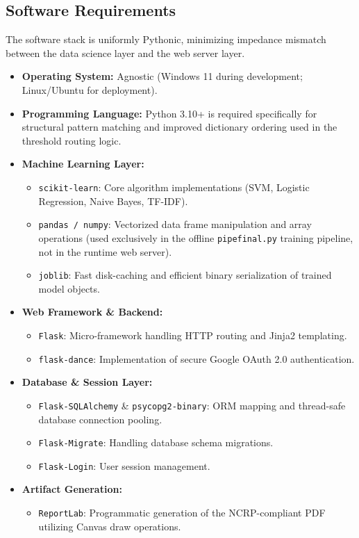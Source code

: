 \subsection{Software Requirements}
The software stack is uniformly Pythonic, minimizing impedance mismatch between the data science layer and the web server layer.
\begin{itemize}
    \item \textbf{Operating System:} Agnostic (Windows 11 during development; Linux/Ubuntu for deployment).
    \item \textbf{Programming Language:} Python 3.10+ is required specifically for structural pattern matching and improved dictionary ordering used in the threshold routing logic.
    \item \textbf{Machine Learning Layer:}
    \begin{itemize}
        \item \texttt{scikit-learn}: Core algorithm implementations (SVM, Logistic Regression, Naive Bayes, TF-IDF).
        \item \texttt{pandas / numpy}: Vectorized data frame manipulation and array operations (used exclusively in the offline \texttt{pipefinal.py} training pipeline, not in the runtime web server).
        \item \texttt{joblib}: Fast disk-caching and efficient binary serialization of trained model objects.
    \end{itemize}
    \item \textbf{Web Framework \& Backend:}
    \begin{itemize}
        \item \texttt{Flask}: Micro-framework handling HTTP routing and Jinja2 templating.
        \item \texttt{flask-dance}: Implementation of secure Google OAuth 2.0 authentication.
    \end{itemize}
    \item \textbf{Database \& Session Layer:}
    \begin{itemize}
        \item \texttt{Flask-SQLAlchemy} \& \texttt{psycopg2-binary}: ORM mapping and thread-safe database connection pooling.
        \item \texttt{Flask-Migrate}: Handling database schema migrations.
        \item \texttt{Flask-Login}: User session management.
    \end{itemize}
    \item \textbf{Artifact Generation:}
    \begin{itemize}
        \item \texttt{ReportLab}: Programmatic generation of the NCRP-compliant PDF utilizing Canvas draw operations.
    \end{itemize}
\end{itemize}


